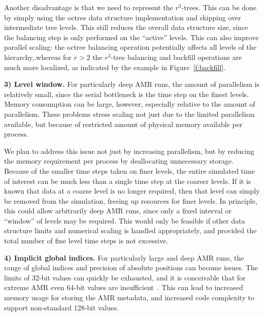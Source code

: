 \documentclass[10pt,twocolumn]{article}
\begin{document}


Another disadvantage is that we need to represent the $r^3$-trees.
This can be done by simply using the octree data structure
implementation and skipping over intermediate tree levels.  This still
reduces the overall data structure size, since the balancing step is
only performed on the ``active'' levels.  This can also improve
parallel scaling: the octree balancing operation potentially affects
all levels of the hierarchy,.whereas for $r>2$ the $r^3$-tree
balancing and backfill operations are much more localized, as
indicated by the example in Figure~\ref{f:backfill}.


\textbf{3) Level window.}  For particularly deep AMR runs, the
amount of parallelism is relatively small, since the serial bottleneck
is the time step on the finest levels.  Memory consumption can be
large, however, especially relative to the amount of parallelism.
These problems stress scaling not just due to the limited parallelism
available, but because of restricted amount of physical memory
available per process.

We plan to address this issue not just by increasing parallelism, but
by reducing the memory requirement per process by deallocating
unnecessary storage.  Because of the smaller time steps taken on finer
levels, the entire simulated time of interest can be much less than a
single time step at the coarser levels.  If it is known that data at a
coarse level is no longer required, then that level can simply be
removed from the simulation, freeing up resources for finer levels.
In principle, this could allow arbitrarily deep AMR runs, since only a
fixed interval or ``window'' of levels may be required.  This would
only be feasible if other data structure limits and numerical scaling
is handled appropriately, and provided the total number of fine level
time steps is not excessive.

\textbf{4) Implicit global indices.}  For particularly large and deep
AMR runs, the range of global indices and precision of absolute
positions can become issues.  The limits of 32-bit values can quickly
be exhausted, and it is conceivable that for extreme AMR even 64-bit
values are insufficient~\cite{@@@abel-abel-128bit}.  This can lead to
increased memory usage for storing the AMR metadata, and increased
code complexity to support non-standard 128-bit values.
\end{document}
